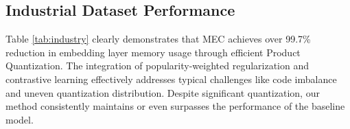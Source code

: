 


\subsection{Industrial Dataset Performance}

Table \ref{tab:industry} clearly demonstrates that MEC achieves over 99.7\% reduction in embedding layer memory usage through efficient Product Quantization. The integration of popularity-weighted regularization and contrastive learning effectively addresses typical challenges like code imbalance and uneven quantization distribution. Despite significant quantization, our method consistently maintains or even surpasses the performance of the baseline model.




    
    

